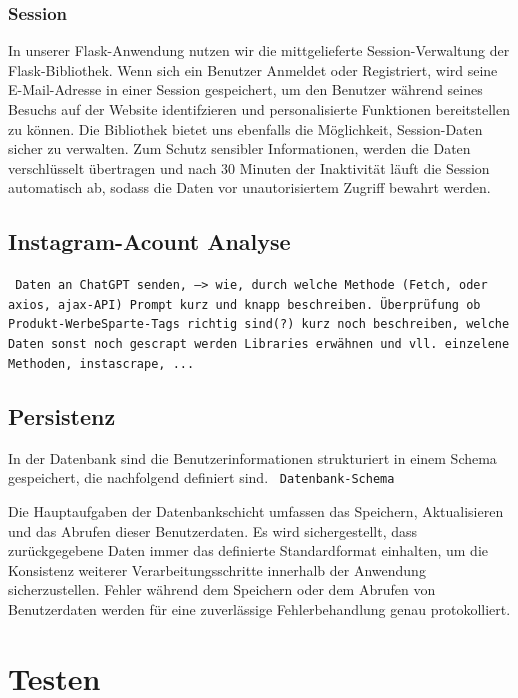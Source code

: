 \documentclass[conference,a4paper,flushend]{cs-techrep}
\begin{document}
\subsubsection{Session}
In unserer Flask-Anwendung nutzen wir die mittgelieferte Session-Verwaltung der Flask-Bibliothek. Wenn sich ein Benutzer Anmeldet oder Registriert, wird seine E-Mail-Adresse in einer Session gespeichert, um den Benutzer während seines Besuchs auf der Website identifzieren und personalisierte Funktionen bereitstellen zu können. Die Bibliothek bietet uns ebenfalls die Möglichkeit, Session-Daten sicher zu verwalten. Zum Schutz sensibler Informationen, werden die Daten verschlüsselt übertragen und nach 30 Minuten der Inaktivität läuft die Session automatisch ab, sodass die Daten vor unautorisiertem Zugriff bewahrt werden.


\subsection{Instagram-Acount Analyse}
\texttt{
Daten an ChatGPT senden, --> wie, durch welche Methode (Fetch, oder axios, ajax-API) 
Prompt kurz und knapp beschreiben. 
Überprüfung ob Produkt-WerbeSparte-Tags richtig sind(?)
kurz noch beschreiben, welche Daten sonst noch gescrapt werden
Libraries erwähnen und vll. einzelene Methoden, instascrape, ...
}
\subsection{Persistenz}

In der Datenbank sind die Benutzerinformationen strukturiert in einem Schema gespeichert, die nachfolgend definiert sind. 
\texttt{
Datenbank-Schema
}

Die Hauptaufgaben der Datenbankschicht umfassen das Speichern, Aktualisieren und das Abrufen dieser Benutzerdaten. Es wird sichergestellt, dass zurückgegebene Daten immer das definierte Standardformat einhalten, um die Konsistenz weiterer Verarbeitungsschritte innerhalb der Anwendung sicherzustellen. Fehler während dem Speichern oder dem Abrufen von Benutzerdaten werden für eine zuverlässige Fehlerbehandlung genau protokolliert.






\section{Testen}
\end{document}
